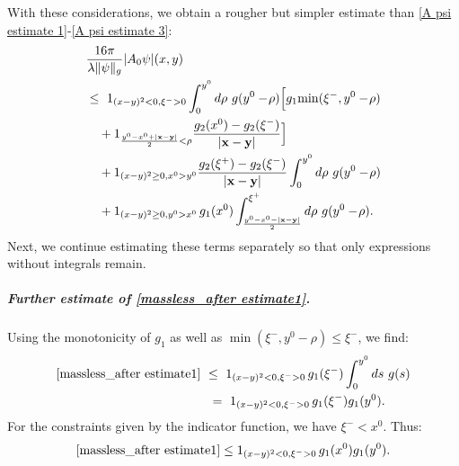 \documentclass[b5paper,draft,openbib,12pt]{memoir}
\newcommand{\vx}{\mathbf{x}}
\newcommand{\vy}{\mathbf{y}}
\begin{document}
With these considerations, we obtain a rougher but simpler estimate than 
\eqref{A psi estimate 1}-\eqref{A psi estimate 3}:
\begin{align}\notag
    &\frac{16\pi}{\lambda\|\psi\|_g}|A_0\psi|(x,y) \\
    &\le~ \label{massless_after estimate1}
    1_{(x-y)^2<0,\xi^->0} \int_0^{y^0}d\rho~ g(y^0-\!\rho)\Big[ g_1\!\min(\xi^-,y^0-\!\rho) \\\label{massless_after estimate2}
    &~~~+ 1_{\frac{y^0-x^0+|\vx-\vy|}{2}<\rho}\frac{g_2(x^0)-g_2(\xi^-)}{|\vx-\vy|}\Big]\\\label{massless_after estimate3}
    &~~~+1_{(x-y)^2\ge0,x^0>y^0}\frac{g_2(\xi^+)-g_2(\xi^-)}{|\vx-\vy|} \int_{0}^{y^0}d\rho~ g(y^0-\!\rho)\\\label{massless_after estimate4}
    &~~~+1_{(x-y)^2\ge0,y^0>x^0}\, g_1(x^0)\int_{\frac{y^0-x^0-|\vx-\vy|}{2}}^{\xi^+}d\rho~ g(y^0-\!\rho).
\end{align}
Next, we continue estimating these terms separately so that only expressions 
without integrals remain.

\subparagraph{Further estimate of \eqref{massless_after estimate1}.}
Using the monotonicity of $g_1$ as well as $\min(\xi^-,y^0-\rho) \leq \xi^-$, 
we find:
\begin{align}
  \eqref{massless_after estimate1} ~&\leq~  1_{(x-y)^2<0,\xi^->0}\, g_1(\xi^-) \int_0^{y^0} ds~ g(s) \notag\\
  &~=~  1_{(x-y)^2<0,\xi^->0} \, g_1(\xi^-) g_1(y^0).
\end{align}
For the constraints given by the indicator function, we have $\xi^- < x^0$. 
Thus:
\begin{equation}
	\eqref{massless_after estimate1} \leq 1_{(x-y)^2<0,\xi^->0} \, g_1(x^0) g_1(y^0).
\label{eq:resultmasslessafterestimate1}
\end{equation}
\end{document}
